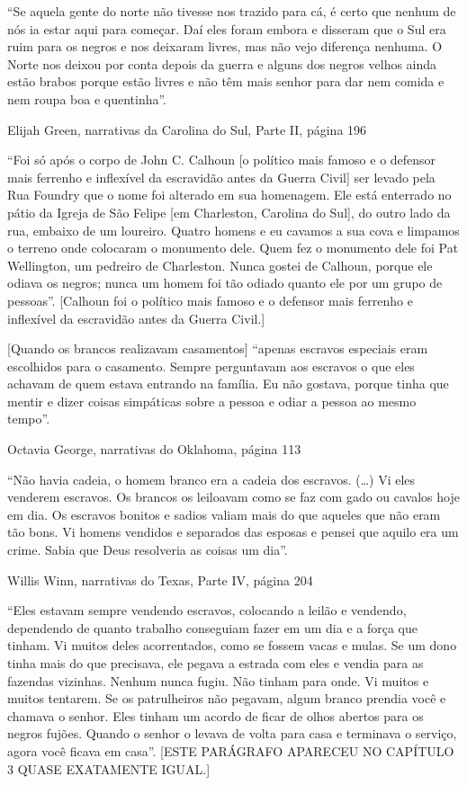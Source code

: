 ``Se aquela gente do norte não tivesse nos trazido para cá, é certo que
nenhum de nós ia estar aqui para começar. Daí eles foram embora e
disseram que o Sul era ruim para os negros e nos deixaram livres, mas
não vejo diferença nenhuma. O Norte nos deixou por conta depois da
guerra e alguns dos negros velhos ainda estão brabos porque estão livres
e não têm mais senhor para dar nem comida e nem roupa boa e quentinha''.

Elijah Green, narrativas da Carolina do Sul, Parte II, página 196

``Foi só após o corpo de John C. Calhoun {[}o político mais famoso e o
defensor mais ferrenho e inflexível da escravidão antes da Guerra
Civil{]} ser levado pela Rua Foundry que o nome foi alterado em sua
homenagem. Ele está enterrado no pátio da Igreja de São Felipe {[}em
Charleston, Carolina do Sul{]}, do outro lado da rua, embaixo de um
loureiro. Quatro homens e eu cavamos a sua cova e limpamos o terreno
onde colocaram o monumento dele. Quem fez o monumento dele foi Pat
Wellington, um pedreiro de Charleston. Nunca gostei de Calhoun, porque
ele odiava os negros; nunca um homem foi tão odiado quanto ele por um
grupo de pessoas''. {[}Calhoun foi o político mais famoso e o defensor
mais ferrenho e inflexível da escravidão antes da Guerra Civil.{]}

{[}Quando os brancos realizavam casamentos{]} ``apenas escravos
especiais eram escolhidos para o casamento. Sempre perguntavam aos
escravos o que eles achavam de quem estava entrando na família. Eu não
gostava, porque tinha que mentir e dizer coisas simpáticas sobre a
pessoa e odiar a pessoa ao mesmo tempo''.

Octavia George, narrativas do Oklahoma, página 113

``Não havia cadeia, o homem branco era a cadeia dos escravos. (\ldots{})
Vi eles venderem escravos. Os brancos os leiloavam como se faz com gado
ou cavalos hoje em dia. Os escravos bonitos e sadios valiam mais do que
aqueles que não eram tão bons. Vi homens vendidos e separados das
esposas e pensei que aquilo era um crime. Sabia que Deus resolveria as
coisas um dia''.

Willis Winn, narrativas do Texas, Parte IV, página 204

``Eles estavam sempre vendendo escravos, colocando a leilão e vendendo,
dependendo de quanto trabalho conseguiam fazer em um dia e a força que
tinham. Vi muitos deles acorrentados, como se fossem vacas e mulas. Se
um dono tinha mais do que precisava, ele pegava a estrada com eles e
vendia para as fazendas vizinhas. Nenhum nunca fugiu. Não tinham para
onde. Vi muitos e muitos tentarem. Se os patrulheiros não pegavam, algum
branco prendia você e chamava o senhor. Eles tinham um acordo de ficar
de olhos abertos para os negros fujões. Quando o senhor o levava de
volta para casa e terminava o serviço, agora você ficava em casa''.
{[}ESTE PARÁGRAFO APARECEU NO CAPÍTULO 3 QUASE EXATAMENTE IGUAL.{]}

